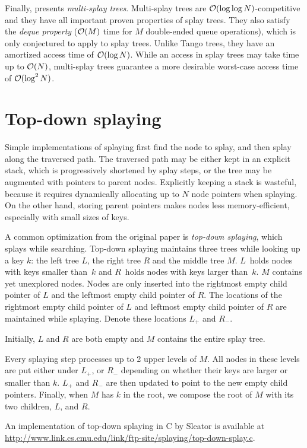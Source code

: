 Finally, \cite{multisplay-trees} presents \emph{multi-splay trees}.
Multi-splay trees are $\mathcal{O}(\log\log N)$-competitive and they have all important
proven properties of splay trees. They also satisfy the \emph{deque property}
($\mathcal{O}(M)$ time for $M$ double-ended queue operations), which is only conjectured
to apply to splay trees.
Unlike Tango trees, they have an amortized access time of $\mathcal{O}(\log N)$.
While an access in splay trees may take time up to $\mathcal{O}(N)$, multi-splay trees
guarantee a more desirable worst-case access time of $\mathcal{O}(\log^2 N)$.

\section{Top-down splaying}
Simple implementations of splaying first find the node to splay, and then
splay along the traversed path. The traversed path may be either kept
in an explicit stack, which is progressively shortened by splay steps,
or the tree may be augmented with pointers to parent nodes.
Explicitly keeping a stack is wasteful, because it requires dynamically
allocating up to $N$ node pointers when splaying. On the other hand,
storing parent pointers makes nodes less memory-efficient, especially
with small sizes of keys.

A common optimization from the original paper \cite{splay} is
\emph{top-down splaying}, which splays while searching.
Top-down splaying maintains three trees while looking up a key $k$:
the left tree $L$, the right tree $R$ and the middle tree $M$.
$L$~holds nodes with keys smaller than~$k$ and $R$~holds nodes with keys
larger than~$k$. $M$ contains yet unexplored nodes.
Nodes are only inserted into the rightmost empty child pointer of $L$
and the leftmost empty child pointer of $R$. The locations of the rightmost
empty child pointer of $L$ and leftmost empty child pointer of $R$ are
maintained while splaying. Denote these locations $L_+$ and $R_-$.

Initially, $L$ and $R$ are both empty and $M$ contains the entire splay tree.

Every splaying step processes up to 2 upper levels of $M$. All nodes in these
levels are put either under $L_+$, or $R_-$ depending on whether their keys
are larger or smaller than $k$. $L_+$ and $R_-$ are then updated to point
to the new empty child pointers.
Finally, when $M$ has $k$ in the root, we compose the root of $M$ with its
two children, $L$, and $R$.

An implementation of top-down splaying in C by Sleator is available
at \url{http://www.link.cs.cmu.edu/link/ftp-site/splaying/top-down-splay.c}.

